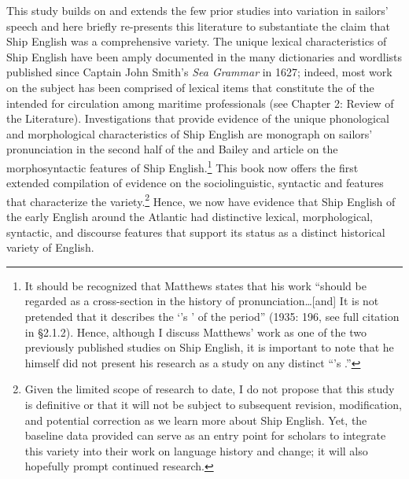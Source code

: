This study builds on and extends the few prior studies into variation in sailors’ speech and here briefly re-presents this literature to substantiate the claim that Ship English was a comprehensive variety. The unique lexical characteristics of Ship English have been amply documented in the many dictionaries and wordlists published since Captain John Smith’s \textit{Sea Grammar} in 1627; indeed, most work on the subject has been comprised of lexical items that constitute the  of the  intended for circulation among maritime professionals (see Chapter 2: Review of the Literature). Investigations that provide evidence of the unique phonological and morphological characteristics of Ship English are  monograph on sailors’ pronunciation in the second half of the  and Bailey and  article on the morphosyntactic features of Ship English.\footnote{It should be recognized that Matthews states that his work “should be regarded as a cross-section in the history of pronunciation…[and] It is not pretended that it describes the ‘’s ’ of the period” (1935: 196, see full citation in §2.1.2). Hence, although I discuss Matthews’ work as one of the two previously published studies on Ship English, it is important to note that he himself did not present his research as a study on any distinct “’s .”}  This book now offers the first extended compilation of evidence on the sociolinguistic, syntactic and  features that characterize the variety.\footnote{Given the limited scope of research to date, I do not propose that this study is definitive or that it will not be subject to subsequent revision, modification, and potential correction as we learn more about Ship English. Yet, the baseline data provided can serve as an entry point for scholars to integrate this variety into their work on language history and change; it will also hopefully prompt continued research.}  Hence, we now have evidence that Ship English of the early English  around the Atlantic had distinctive lexical, morphological, syntactic, and discourse features that support its status as a distinct historical variety of English. 

